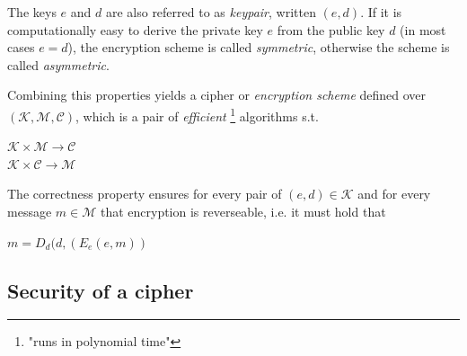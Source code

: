 The keys $e$ and $d$ are also referred to as \textit{keypair}, written $(e,d)$. 
If it is computationally easy to derive the private key $e$ from the public key $d$ (in most cases $e = d$), the encryption scheme
 is called \textit{symmetric}, otherwise the scheme is called \textit{asymmetric}.

Combining this properties yields a cipher or \textit{encryption scheme} defined over $\mathcal{(K,M,C)}$, which is a pair of \textit{efficient}
 \footnote{"runs in polynomial time"} algorithms s.t.
 \begin{center}
   $\mathcal{K} \times \mathcal{M} \rightarrow \mathcal{C}$
   \\
   $\mathcal{K} \times \mathcal{C} \rightarrow \mathcal{M}$
 \end{center}

 The correctness property ensures for every pair of $(e,d) \in \mathcal{K}$ and for every message $m \in \mathcal{M}$ that encryption is reverseable, i.e. 
 it must hold that 
 \begin{center}  
 $ m = D_d(d, (E_e(e, m))$
  \end{center}

\subsection{Security of a cipher}

